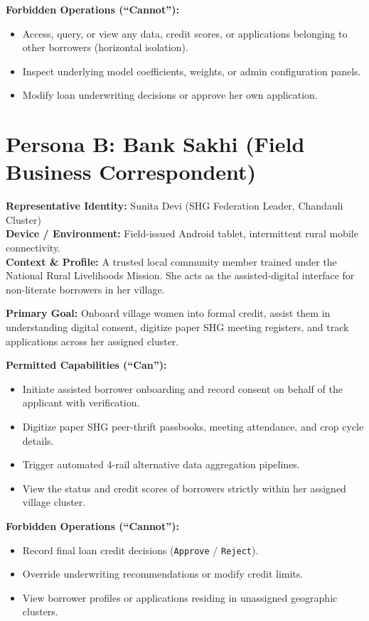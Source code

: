 \noindent\textbf{Forbidden Operations (``Cannot''):}
\begin{itemize}[leftmargin=1.5em, itemsep=1pt]
  \item Access, query, or view any data, credit scores, or applications belonging to other borrowers (horizontal isolation).
  \item Inspect underlying model coefficients, weights, or admin configuration panels.
  \item Modify loan underwriting decisions or approve her own application.
\end{itemize}

\section{Persona B: Bank Sakhi (Field Business Correspondent)}
\noindent\textbf{Representative Identity:} Sunita Devi (SHG Federation Leader, Chandauli Cluster)\\
\textbf{Device / Environment:} Field-issued Android tablet, intermittent rural mobile connectivity.\\
\textbf{Context \& Profile:} A trusted local community member trained under the National Rural Livelihoods Mission. She acts as the assisted-digital interface for non-literate borrowers in her village.

\vspace{0.2cm}
\noindent\textbf{Primary Goal:} Onboard village women into formal credit, assist them in understanding digital consent, digitize paper SHG meeting registers, and track applications across her assigned cluster.

\vspace{0.2cm}
\noindent\textbf{Permitted Capabilities (``Can''):}
\begin{itemize}[leftmargin=1.5em, itemsep=1pt]
  \item Initiate assisted borrower onboarding and record consent on behalf of the applicant with verification.
  \item Digitize paper SHG peer-thrift passbooks, meeting attendance, and crop cycle details.
  \item Trigger automated 4-rail alternative data aggregation pipelines.
  \item View the status and credit scores of borrowers strictly within her assigned village cluster.
\end{itemize}

\noindent\textbf{Forbidden Operations (``Cannot''):}
\begin{itemize}[leftmargin=1.5em, itemsep=1pt]
  \item Record final loan credit decisions (\texttt{Approve} / \texttt{Reject}).
  \item Override underwriting recommendations or modify credit limits.
  \item View borrower profiles or applications residing in unassigned geographic clusters.
\end{itemize}

